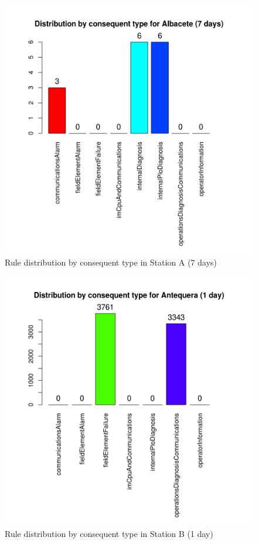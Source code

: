 \begin{figure}[hbtp]
\includegraphics[width=\textwidth]{img/conseqtypes_alb7.png}
\caption{Rule distribution by consequent type in Station A (7 days)} \label{fig:conseqtypes_alb7}
\end{figure}

\begin{figure}[hbtp]
\includegraphics[width=\textwidth]{img/conseqtypes_ant1.png}
\caption{Rule distribution by consequent type in Station B (1 day)} \label{fig:conseqtypes_ant1}
\end{figure}


